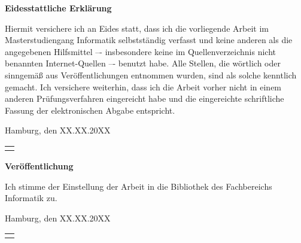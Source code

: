 
\clearpage
\thispagestyle{empty}
\pagestyle{empty}

\begin{center}
	\Large
	\textbf{Eidesstattliche Erklärung}
\end{center}
\noindent
Hiermit versichere ich an Eides statt, dass ich die vorliegende Arbeit im Masterstudiengang Informatik selbstständig verfasst und keine anderen als die angegebenen Hilfsmittel –- insbesondere keine im Quellenverzeichnis nicht benannten Internet-Quellen –- benutzt habe. Alle Stellen, die wörtlich oder sinngemäß aus Veröffentlichungen entnommen wurden, sind als solche kenntlich gemacht. Ich versichere weiterhin, dass ich die Arbeit vorher nicht in einem anderen Prüfungsverfahren eingereicht habe und die eingereichte schriftliche Fassung der elektronischen Abgabe entspricht.

\vspace*{1.5cm}
\noindent
Hamburg, den XX.XX.20XX
\hspace*{\fill}
\begin{tabular}{@{}l@{}}
	\hline
	\makebox[5cm]{Hauke Stieler}
\end{tabular}

\vspace*{3cm}

\begin{center}
	\Large
	\textbf{Veröffentlichung}
\end{center}
\noindent
Ich stimme der Einstellung der Arbeit in die Bibliothek des Fachbereichs Informatik zu.

\vspace*{1.5cm}
\noindent
Hamburg, den XX.XX.20XX
\hspace*{\fill}
\begin{tabular}{@{}l@{}}
	\hline
	\makebox[5cm]{Hauke Stieler}
\end{tabular}
